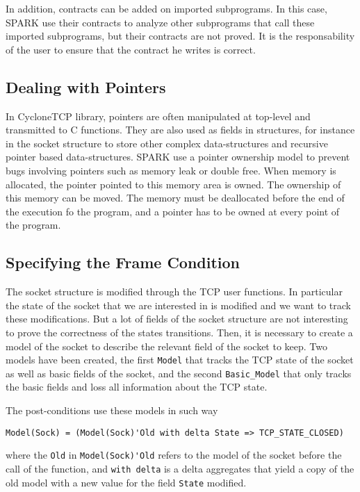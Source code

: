 \documentclass[runningheads]{llncs}
\begin{document}
    In addition, contracts can be added on imported subprograms. In this case,
    SPARK use their contracts to analyze other subprograms that call these imported
    subprograms, but their contracts are not proved. It is the responsability of the
    user to ensure that the contract he writes is correct.

\subsection{Dealing with Pointers}

    In CycloneTCP library, pointers are often manipulated at top-level and
    transmitted to C functions.  They are also used as fields in structures,
    for instance in the socket structure to store other complex data-structures
    and recursive pointer based data-structures.
    SPARK use a pointer ownership model to prevent bugs involving pointers such
    as memory leak or double free. When memory is allocated, the pointer pointed
    to this memory area is owned. The ownership of this memory can be moved.
    The memory must be deallocated before the end of the execution fo the program,
    and a pointer has to be owned at every point of the program.


\subsection{Specifying the Frame Condition}

    The socket structure is modified through the TCP user functions. In particular
    the state of the socket that we are interested in is modified and we want to
    track these modifications. But a lot of fields of the socket structure are not
    interesting to prove the correctness of the states transitions. Then, it is
    necessary to create a model of the socket to describe the relevant field of
    the socket to keep. Two models have been created, the first \lstinline{Model}
    that tracks the TCP state of the socket as well as basic fields of the socket,
    and the second \lstinline{Basic_Model} that only tracks the basic fields and
    loss all information about the TCP state.

    The post-conditions use these models in such way
    \begin{lstlisting}[style=Spark]
    Model(Sock) = (Model(Sock)'Old with delta State => TCP_STATE_CLOSED)
    \end{lstlisting}
    where the \lstinline{Old} in \lstinline{Model(Sock)'Old} refers to the model
    of the socket before the call of the function, and \lstinline{with delta} is
    a delta aggregates that yield a copy of the old model with a new value for
    the field \lstinline{State} modified.
\end{document}
